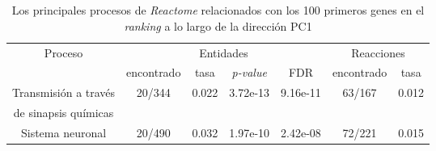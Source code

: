 
\chapter{}\label{apx:apx4}

\begin{table}[!htb]
	\centering
	\caption{Los principales procesos de \textit{Reactome} relacionados con los 100 primeros genes en el \textit{ranking} a lo largo de la dirección PC1}
	\label{tab:apx4}
	\begin{tabular}{|c|c|c|c|c|c|c|}
		\hline
		\multirow{2}{*}{Proceso} & \multicolumn{4}{c|}{Entidades} & \multicolumn{2}{c|}{Reacciones} \\ \cline{2-7}
		 & encontrado & tasa & \textit{p-value} & FDR & encontrado & tasa \\ \hline
		 Transmisión a través  & \multirow{2}{*}{20/344} & \multirow{2}{*}{0.022} & \multirow{2}{*}{3.72e-13} & \multirow{2}{*}{9.16e-11} & \multirow{2}{*}{63/167} & \multirow{2}{*}{0.012} \\
		 de sinapsis químicas & & & & & & \\ \hline
		 
		 Sistema neuronal & 20/490 & 0.032 & 1.97e-10 & 2.42e-08 & 72/221 & 0.015 \\ \hline
		 
		 
	\end{tabular}
\end{table}